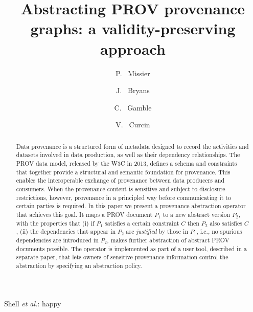 \documentclass{elsarticle}
\begin{document}
\title{Abstracting PROV provenance graphs: a validity-preserving approach}

 
\author[ncl]{P. ~Missier }

\author[cov]{J. ~Bryans}

\author[ncl]{C. ~Gamble}
    
\author[kcl]{V. ~Curcin}

\address[ncl]{School of Computing, Newcastle University, UK}
\address[cov]{Institute for Future Transport and Cities, Coventry University, UK}
\address[kcl]{Kings College, London, UK}



%
{Shell \MakeLowercase{\textit{et al.}}: happy}


\begin{abstract}
  Data provenance is a structured form of metadata designed to record the activities and datasets involved in data production, as well as their dependency relationships. The PROV data model, released by the W3C in 2013, defines a schema and constraints that together provide a structural and semantic foundation for provenance. This enables the interoperable exchange of provenance between data producers and consumers. When the provenance content is sensitive and subject to disclosure restrictions, however,  provenance in a principled way before communicating it to certain parties is required. In this paper we present a provenance abstraction operator that achieves this goal. It maps a PROV document $P_1$  to a new abstract version $P_2$, with the properties that (i) if $P_1$ satisfies a certain constraint $C$ then $P_2$ also satisfies $C$, (ii) the dependencies that appear in $P_2$ are \textit{justified} by those in $P_1$, i.e., no spurious dependencies are introduced in $P_2$,    makes further abstraction of abstract PROV documents possible.  The operator is implemented as part of a user tool, described in a separate paper, that lets owners of sensitive provenance information control the abstraction by specifying an abstraction policy.
\end{abstract}
\end{document}
